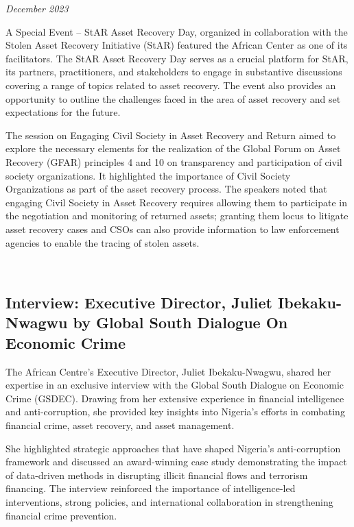 \documentclass[
  letterpaper,
  DIV=11,
  numbers=noendperiod]{scrreprt}
\begin{document}
\emph{December 2023}

A Special Event -- StAR Asset Recovery Day, organized in collaboration
with the Stolen Asset Recovery Initiative (StAR) featured the African
Center as one of its facilitators. The StAR Asset Recovery Day serves as
a crucial platform for StAR, its partners, practitioners, and
stakeholders to engage in substantive discussions covering a range of
topics related to asset recovery. The event also provides an opportunity
to outline the challenges faced in the area of asset recovery and set
expectations for the future.

The session on Engaging Civil Society in Asset Recovery and Return aimed
to explore the necessary elements for the realization of the Global
Forum on Asset Recovery (GFAR) principles 4 and 10 on transparency and
participation of civil society organizations. It highlighted the
importance of Civil Society Organizations as part of the asset recovery
process. The speakers noted that engaging Civil Society in Asset
Recovery requires allowing them to participate in the negotiation and
monitoring of returned assets; granting them locus to litigate asset
recovery cases and CSOs can also provide information to law enforcement
agencies to enable the tracing of stolen assets.

~

\subsection{Interview: Executive Director, Juliet Ibekaku-Nwagwu by
Global South Dialogue On Economic
Crime}\label{interview-executive-director-juliet-ibekaku-nwagwu-by-global-south-dialogue-on-economic-crime}

The African Centre's Executive Director, Juliet Ibekaku-Nwagwu, shared
her expertise in an exclusive interview with the Global South Dialogue
on Economic Crime (GSDEC). Drawing from her extensive experience in
financial intelligence and anti-corruption, she provided key insights
into Nigeria's efforts in combating financial crime, asset recovery, and
asset management.

She highlighted strategic approaches that have shaped Nigeria's
anti-corruption framework and discussed an award-winning case study
demonstrating the impact of data-driven methods in disrupting illicit
financial flows and terrorism financing. The interview reinforced the
importance of intelligence-led interventions, strong policies, and
international collaboration in strengthening financial crime prevention.
\end{document}
